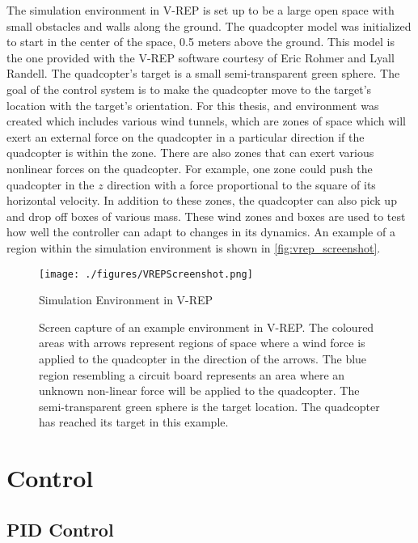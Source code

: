 \documentclass[letterpaper,12pt,titlepage,oneside,final]{book}
\begin{document}

The simulation environment in V-REP is set up to be a large open space with small obstacles and walls along the ground. 
The quadcopter model was initialized to start in the center of the space, 0.5 meters above the ground. 
This model is the one provided with the V-REP software courtesy of Eric Rohmer and Lyall Randell. 
The quadcopter's target is a small semi-transparent green sphere. The goal of the control system is to make the quadcopter move to the target's location with the target's orientation. 
For this thesis, and environment was created which includes various wind tunnels, which are zones of space which will exert an external force on the quadcopter in a particular direction if the quadcopter is within the zone. 
There are also zones that can exert various nonlinear forces on the quadcopter. 
For example, one zone could push the quadcopter in the $z$ direction with a force proportional to the square of its horizontal velocity. 
In addition to these zones, the quadcopter can also pick up and drop off boxes of various mass. 
These wind zones and boxes are used to test how well the controller can adapt to changes in its dynamics.
An example of a region within the simulation environment is shown in \autoref{fig:vrep_screenshot}.

\begin{figure}
\centering
\texttt{[image: ./figures/VREPScreenshot.png]}
\caption{Simulation Environment in V-REP}
\label{fig:vrep_screenshot}
\captionsetup{singlelinecheck=off,font=footnotesize}
\caption*{
Screen capture of an example environment in V-REP. The coloured areas with arrows represent regions of space where a wind force is applied to the quadcopter in the direction of the arrows. The blue region resembling a circuit board represents an area where an unknown non-linear force will be applied to the quadcopter. The semi-transparent green sphere is the target location. The quadcopter has reached its target in this example.}
\end{figure}

\chapter{Control} \label{chap:control}

\section{PID Control}
\end{document}
